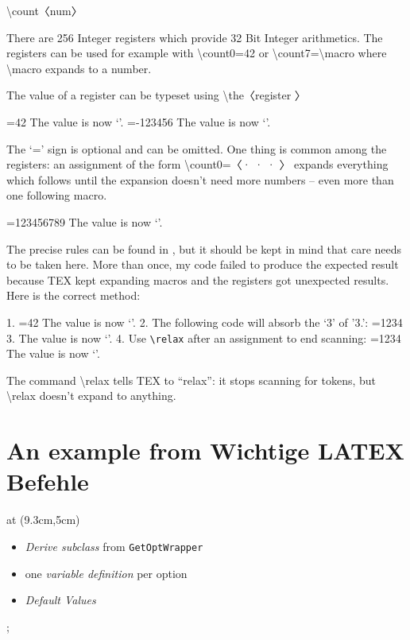 \textbackslash  count〈num〉

There are 256 Integer registers which provide 32 Bit Integer arithmetics. The registers can be used for
example with \textbackslash  count0=42 or \textbackslash  count7=\textbackslash  macro where \textbackslash  macro expands to a number.

The value of a register can be typeset using \textbackslash  the〈register 〉

\begin{Example}
=42
The value is now ‘\the{}’.
\def\macro{-123456}
=\macro
The value is now ‘\the{}’.
\end{Example}

The ‘=’ sign is optional and can be omitted. One thing is common among the registers: an assignment
of the form \textbackslash count0=〈· · · 〉 expands everything which follows until the expansion doesn’t need more
numbers – even more than one following macro.

\begin{Example}
\def\firstmacro{123}
\def\secondmacro{456}
\def\thirdmacro{789}
=\firstmacro\secondmacro\thirdmacro
The value is now ‘\the{}’.
\end{Example}
The precise rules can be found in , but it should be kept in mind that care needs to be taken here.
More than once, my code failed to produce the expected result because TEX kept expanding macros
and the registers got unexpected results. Here is the correct method:

\begin{Example}
1. =42 %
The value is now ‘\the{}’.
2. The following code will absorb the ‘3’ of ’3.’:
\def\macro{1234}
=\macro %
3. The value is now ‘\the{}’.
4. Use \verb"\relax" after an assignment to end scanning:
=\macro\relax
The value is now ‘\the{}’.
\end{Example}
The command \textbackslash relax tells TEX to “relax”: it stops scanning for tokens, but \textbackslash relax doesn’t expand to
anything.
\section*{An example from Wichtige LATEX Befehle}
\begin{Example}
\def\tikzoverlay{%
 \tikzexternaldisable
 \node[every overlay node,/utils/exec=\
tikzexternalenable]}

\tikzoverlay[text width=6cm] at (9.3cm,5cm) {
\begin{itemize}
\item \emph{Derive subclass} from \texttt{GetOptWrapper}
\item one \emph{variable definition} per option
\item \emph{Default Values}
\end{itemize}
};
\end{Example}

